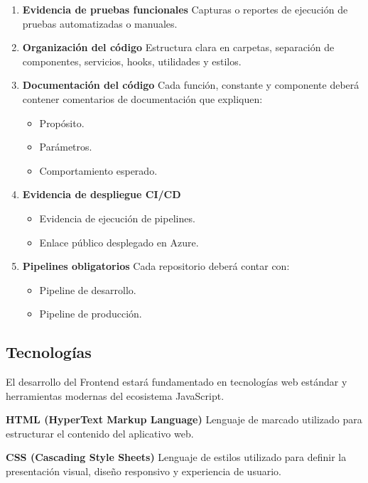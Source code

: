 \documentclass[12pt]{article}
\begin{document}
\begin{enumerate}
    \item \textbf{Evidencia de pruebas funcionales}  
    Capturas o reportes de ejecución de pruebas automatizadas o manuales.

    \item \textbf{Organización del código}  
    Estructura clara en carpetas, separación de componentes, servicios, hooks, utilidades y estilos.

    \item \textbf{Documentación del código}  
    Cada función, constante y componente deberá contener comentarios de documentación que expliquen:
    \begin{itemize}
        \item Propósito.
        \item Parámetros.
        \item Comportamiento esperado.
    \end{itemize}

    \item \textbf{Evidencia de despliegue CI/CD}  
    \begin{itemize}
        \item Evidencia de ejecución de pipelines.
        \item Enlace público desplegado en Azure.
    \end{itemize}

    \item \textbf{Pipelines obligatorios}  
    Cada repositorio deberá contar con:
    \begin{itemize}
        \item Pipeline de desarrollo.
        \item Pipeline de producción.
    \end{itemize}
\end{enumerate}
\subsection{Tecnologías}

El desarrollo del Frontend estará fundamentado en tecnologías web estándar y herramientas modernas del ecosistema JavaScript.

\textbf{HTML (HyperText Markup Language)}  
Lenguaje de marcado utilizado para estructurar el contenido del aplicativo web.

\textbf{CSS (Cascading Style Sheets)}  
Lenguaje de estilos utilizado para definir la presentación visual, diseño responsivo y experiencia de usuario.
\end{document}
